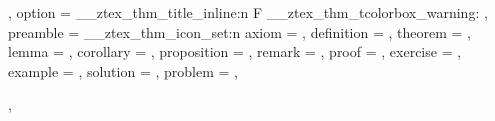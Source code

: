 {{{\begin{tcolorbox}
    },
    end = {\end{tcolorbox}},
    option = {
      \__ztex_thm_title_inline:n {F}
      \__ztex_thm_tcolorbox_warning:
    },
    preamble = {
      \zthmtitleformat*{\bfseries
        \zthmname\ \zthmnumber
        \zthmnotemptyTF{}{\\}
        \zthmnote{}{}
      }
      \newcommand{\ztex@llapnote}[1]{
        \mbox{}\llap{
        \adjustbox{set~height=0pt, set~depth=0pt}{
          \parbox[t]{2.85cm}{\raggedleft #1}}\hspace*{.75em}}
      }
      \__ztex_thm_icon_set:n 
        {
          axiom       = ,
          definition  = , 
          theorem     = , 
          lemma       = ,
          corollary   = , 
          proposition = , 
          remark      = ,
          proof       = , 
          exercise    = ,
          example     = ,
          solution    = , 
          problem     = ,
        }
    }
  },
}
